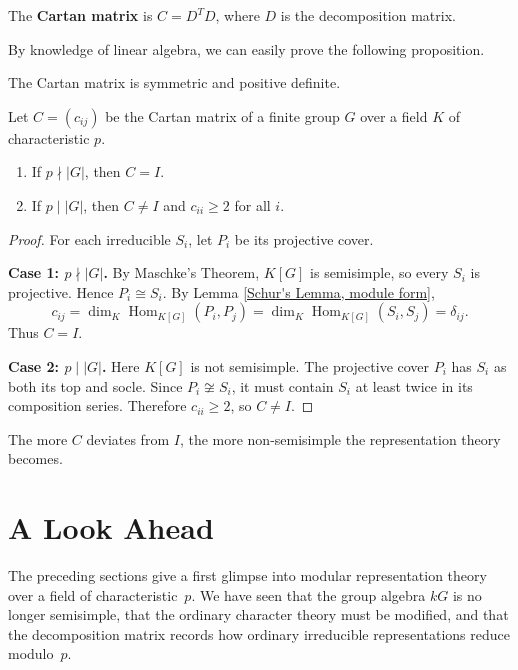 \begin{defn}
The \textbf{Cartan matrix} is \(C = D^T D\), where $D$ is the decomposition matrix.
\end{defn}
By knowledge of linear algebra, we can easily prove the following proposition.

\begin{prop}
The Cartan matrix is  symmetric and positive definite.
\end{prop}


\begin{thm}
Let $C = (c_{ij})$ be the Cartan matrix of a finite group $G$ over a field $K$ of characteristic $p$.
\begin{enumerate}
    \item If $p \nmid |G|$, then $C = I$.
    \item If $p \mid |G|$, then $C \neq I$ and $c_{ii} \ge 2$ for all $i$.
\end{enumerate}
\end{thm}

\begin{proof}
For each irreducible $S_i$, let $P_i$ be its projective cover.

\textbf{Case 1: $p \nmid |G|$.} By Maschke's Theorem, $K[G]$ is semisimple, so every $S_i$ is projective. Hence $P_i \cong S_i$. By Lemma \ref{Schur's Lemma, module form},
\[
c_{ij} = \dim_K \operatorname{Hom}_{K[G]}(P_i, P_j) = \dim_K \operatorname{Hom}_{K[G]}(S_i, S_j) = \delta_{ij}.
\]
Thus $C = I$.

\textbf{Case 2: $p \mid |G|$.} Here $K[G]$ is not semisimple. The projective cover $P_i$ has $S_i$ as both its top and socle. Since $P_i \not\cong S_i$, it must contain $S_i$ at least twice in its composition series. Therefore $c_{ii} \ge 2$, so $C \neq I$.
\end{proof}

\begin{remark}
The more $C$ deviates from $I$, the more non-semisimple the representation theory becomes.
\end{remark}

\section{A Look Ahead}

The preceding sections give a first glimpse into modular representation 
theory over a field of characteristic~$p$. We have seen that the group 
algebra $kG$ is no longer semisimple, that the ordinary character theory 
must be modified, and that the decomposition matrix records how ordinary 
irreducible representations reduce modulo~$p$. 

